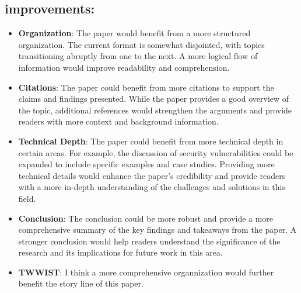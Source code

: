 \documentclass[12pt]{article}
\begin{document}
\subsection*{improvements: }
\begin{itemize}
    \item \textbf{Organization}: The paper would benefit from a more structured organization. The current format is somewhat disjointed, with topics transitioning abruptly from one to the next. A more logical flow of information would improve readability and comprehension.
    \item \textbf{Citations}: The paper could benefit from more citations to support the claims and findings presented. While the paper provides a good overview of the topic, additional references would strengthen the arguments and provide readers with more context and background information.
    \item \textbf{Technical Depth}: The paper could benefit from more technical depth in certain areas. For example, the discussion of security vulnerabilities could be expanded to include specific examples and case studies. Providing more technical details would enhance the paper's credibility and provide readers with a more in-depth understanding of the challenges and solutions in this field.
    \item \textbf{Conclusion}: The conclusion could be more robust and provide a more comprehensive summary of the key findings and takeaways from the paper. A stronger conclusion would help readers understand the significance of the research and its implications for future work in this area.
    \item \textbf{TWWIST}: I think a more comprehensive organnization would further benefit the story line of this paper. 
\end{itemize}
\end{document}
